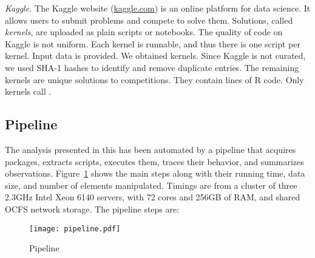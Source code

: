\documentclass[review,screen,acmsmall,anonymous=true]{acmart}
\newcommand{\mypara}[1]{\medskip\noindent\emph{#1}\xspace}
\begin{document}
\mypara{Kaggle.} The Kaggle website ({\small \url{kaggle.com}}) is an online
platform for data science. It allows users to submit problems and compete to
solve them. Solutions, called \emph{kernels}, are uploaded as plain scripts or
notebooks. The quality of code on Kaggle is not uniform. Each kernel is
runnable, and thus there is one script per kernel. Input data is provided. We
obtained \KaggleKernels kernels. Since Kaggle is not curated, we used SHA-1 hashes
to identify and remove \KaggleDuplicates duplicate entries. The remaining
\KaggleUnique kernels are unique solutions to \KaggleCompetitions competitions.
They contain \KaggleCode lines of R code. Only \KaggleWithEvals kernels call
\eval.

\subsection{Pipeline}

The analysis presented in this has been automated by a pipeline that acquires
packages, extracts scripts, executes them, traces their behavior, and summarizes observations. Figure~\ref{fig:pipeline} shows the main steps along
 with their running time, data size, and  number of elements manipulated.
  Timings are from a cluster of three 2.3GHz Intel Xeon 6140 servers, with 72 cores and 256GB of RAM, and shared OCFS network storage. The pipeline steps are:


\begin{figure}[!h]\hspace{-5mm}
  \texttt{[image: pipeline.pdf]}
  \caption{Pipeline}\label{fig:pipeline}
\end{figure}
\end{document}
